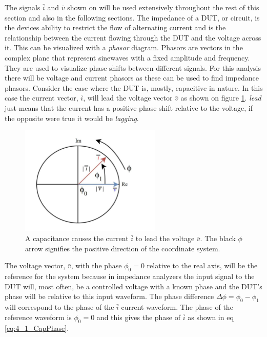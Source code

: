 The signals $\bar i$ and $\bar v$ shown on  will be used extensively throughout the rest of this section and also in the following sections. The impedance of a DUT, or circuit, is the devices ability to restrict the flow of alternating current and is the relationship between the current flowing through the DUT and the voltage across it. This can be visualized with a \textit{phasor} diagram. Phasors are vectors in the complex plane that represent sinewaves with a fixed amplitude and frequency. They are used to visualize phase shifts between different signals. For this analysis there will be voltage and current phasors as these can be used to find impedance phasors. Consider the case where the DUT is, mostly, capacitive in nature. In this case the current vector, $\bar i$, will lead the voltage vector $\bar v$ as shown on figure \ref{fig:4_1_CapPhasor}. \textit{lead} just means that the current has a positive phase shift relative to the voltage, if the opposite were true it would be \textit{lagging}.

\begin{figure}[H]
    \centering
    \includegraphics[clip, trim=0 0 0 0, width=0.60\textwidth]{Sections/4_TechnicalAnalysis/Figures/4_1_CapacitancePhasor.pdf}
    \caption{A capacitance causes the current $\bar i$ to lead the voltage $\bar v$. The black $\phi$ arrow signifies the positive direction of the coordinate system.}
    \label{fig:4_1_CapPhasor}
\end{figure}

The voltage vector, $\bar v$, with the phase $\phi_0 = 0$ relative to the real axis, will be the reference for the system because in impedance analyzers the input signal to the DUT will, most often, be a controlled voltage with a known phase and the DUT's phase will be relative to this input waveform. The phase difference $\Delta \phi = \phi_0 - \phi_1$ will correspond to the phase of the $\bar i$ current waveform. The phase of the reference waveform is $\phi_0 = 0$ and this gives the phase of $\bar i$ as shown in eq \ref{eq:4_1_CapPhase}.

